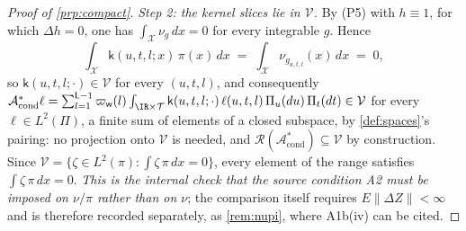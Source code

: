 \begin{proof}[Proof of \cref{prp:compact}]
\emph{Step 2: the kernel slices lie in $\mathcal V$.}
By (P5) with $h\equiv1$, for which $\Delta h=0$, one has $\int_{\mathcal X}\nu_{g}\,dx=0$ for every
integrable $g$. Hence
\[
\int_{\mathcal X}\mathsf k(u,t,l;x)\,\pi(x)\,dx\;=\;\int_{\mathcal X}\nu_{g_{u,t,l}}(x)\,dx\;=\;0,
\]
so $\mathsf k(u,t,l;\cdot)\in\mathcal V$ for every $(u,t,l)$, and consequently
$\mathcal A^\ast_{\mathrm{cond}}\ell
=\sum_{l=1}^{\mathsf L-1}\varpi_{\mathsf w}(l)\int_{\IR\times\mathcal T}\mathsf k(u,t,l;\cdot)\,\ell(u,t,l)\,\Pi_u(du)\,\Pi_t(dt)
\in\mathcal V$ for every
$\ell\in L^{2}(\Pi)$, a finite sum of elements of a closed subspace, by \cref{def:spaces}'s pairing:
no projection onto $\mathcal V$ is needed, and
$\mathcal R(\mathcal A^\ast_{\mathrm{cond}})\subseteq\mathcal V$ by construction. Since
$\mathcal V=\{\zeta\in L^{2}(\pi):\int\zeta\,\pi\,dx=0\}$, every element of the range satisfies
$\int\zeta\,\pi\,dx=0$. \emph{This is the internal check that the source condition A2 must be imposed on
$\nu/\pi$ rather than on $\nu$}; the comparison itself requires $E\|\Delta Z\|<\infty$ and is therefore
recorded separately, as \cref{rem:nupi}, where A1b(iv) can be cited.


\end{proof}
